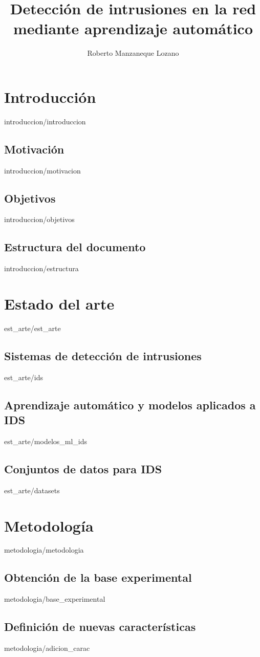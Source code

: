 \documentclass[epsbased,copyright,final,printable,covers,extendedindex,firstnumbered,tfg,gnuplot]{tfgtfmthesisuam}
\title{Detección de intrusiones en la red mediante aprendizaje automático}
\subtitle{}
\author{Roberto Manzaneque Lozano}
\begin{document}
\chapter{Introducción\label{CAP:INTRO}}{introduccion/introduccion}
  \section{Motivación\label{SEC:MOTIVACION}}{introduccion/motivacion}
  \section{Objetivos\label{SEC:OBJETIVOS}}{introduccion/objetivos}
  \section{Estructura del documento\label{SEC:ESTRUCTURA}}{introduccion/estructura}
\chapter{Estado del arte\label{CAP:EST_ARTE}}{est_arte/est_arte}
  \section{Sistemas de detección de intrusiones\label{SEC:IDS}}{est_arte/ids}
  \section{Aprendizaje automático y modelos aplicados a IDS\label{SEC:ML_IDS}}{est_arte/modelos_ml_ids}
  \section{Conjuntos de datos para IDS\label{SEC:DS_IDS}}{est_arte/datasets}
\chapter{Metodología\label{CAP:METODOLOGIA}}{metodologia/metodologia}
  \section{Obtención de la base experimental\label{SEC:BASEEX}}{metodologia/base_experimental}
  \section{Definición de nuevas características\label{SEC:NEW_FEAT}}{metodologia/adicion_carac}
\end{document}
